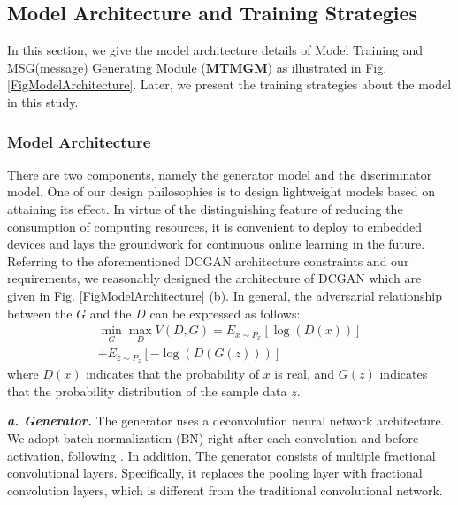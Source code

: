 \subsection{Model Architecture and Training Strategies}
In this section, we give the model architecture details of Model Training and MSG(message) Generating Module (\textbf{MTMGM}) as illustrated in Fig. \ref{FigModelArchitecture}. Later, we present the training strategies about the model in this study.

\subsubsection{Model Architecture}
There are two components, namely the generator model and the discriminator model. One of our design philosophies is to design lightweight models based on attaining its effect.  In virtue of the distinguishing feature of reducing the consumption of computing resources, it is convenient to deploy to embedded devices and lays the groundwork for continuous online learning in the future. Referring to the aforementioned DCGAN architecture constraints and our requirements, we reasonably designed the architecture of DCGAN which are given in Fig. \ref{FigModelArchitecture} (b). In general, the adversarial relationship between the $G$ and the $D$ can be expressed as follows:
\begin{equation}
\begin{array}{c}
{\min _G}{\max _D}V(D,G) = {E_{x\sim{P_x}}}\left[ {\log (D(x))} \right]\\
+ {E_{z\sim{P_z}}}\left[ { - \log (D(G(z)))} \right]
\end{array}
\end{equation}
where $D(x)$ indicates that the probability of $x$ is real, and $G(z)$ indicates that the probability distribution  of the sample data $z$. 

\quad \textit{\textbf{a. Generator.}} The generator uses a deconvolution \cite{dumoulin2016guide} neural network architecture. We adopt batch normalization (BN) right after each convolution and before activation, following \cite{ioffe2015batch}. In addition, The generator consists of multiple fractional convolutional layers.  Specifically, it replaces the pooling layer with fractional convolution layers, which is different from the traditional convolutional network. 

